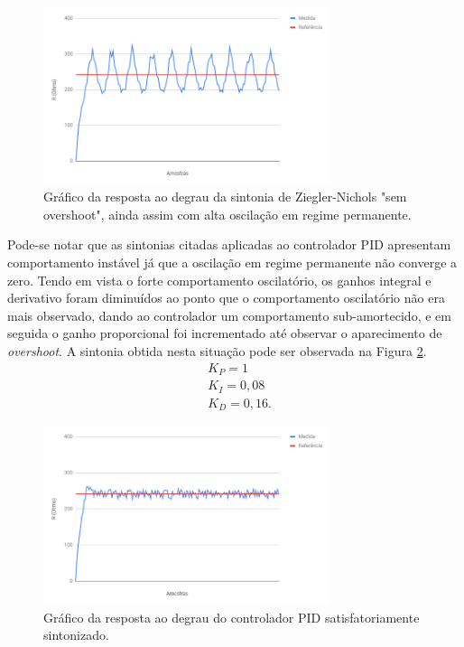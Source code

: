 \begin{figure}[ht]
    \begin{center}
    \includegraphics[width=0.75\textwidth]{figuras/znso.PNG}
    \end{center}
    \caption[Gráfico da sintonia de Ziegler-Nichols "sem overshoot".]{Gráfico da resposta ao degrau da sintonia de Ziegler-Nichols "sem overshoot", ainda assim com alta oscilação em regime permanente.}
    \label{znso}
\end{figure}

Pode-se notar que as sintonias citadas aplicadas ao controlador PID apresentam comportamento instável já que a oscilação em regime permanente não converge a zero. Tendo em vista o forte comportamento oscilatório, os ganhos integral e derivativo foram diminuídos ao ponto que o comportamento oscilatório não era mais observado, dando ao controlador um comportamento sub-amortecido, e em seguida o ganho proporcional foi incrementado até observar o aparecimento de \textit{overshoot}. A sintonia obtida nesta situação pode ser observada na Figura \ref{znsint}. 
\begin{align}
  &K_P = 1 \nonumber\\
  &K_I = 0,08 \nonumber\\
  &K_D = 0,16. \nonumber
\end{align}

\begin{figure}[ht]
    \begin{center}
    \includegraphics[width=0.75\textwidth]{figuras/znsint.PNG}
    \end{center}
    \caption[Gráfico do controlador PID satisfatoriamente sintonizado.]{Gráfico da resposta ao degrau do controlador PID satisfatoriamente sintonizado.}
    \label{znsint}
\end{figure}

